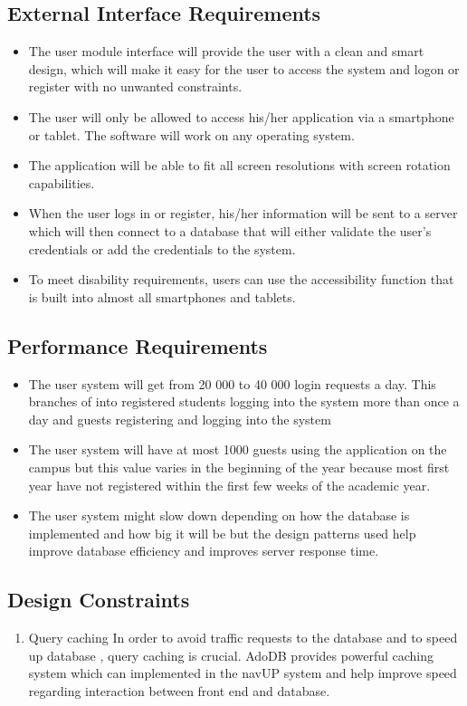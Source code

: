 \subsection{External Interface Requirements}
\begin{itemize}
	\item The user module interface will provide the user with a clean and smart design, which will make it easy for the user to access the system and logon or register with no unwanted constraints.
	\item The user will only be allowed to access his/her application via a smartphone or tablet. The software will work on any operating system. 
        \item The application will be able to fit all screen resolutions with screen rotation capabilities.
	\item When the user logs in or register, his/her information will be sent to a server which will then connect to a database that will either validate the user’s credentials or add the credentials to the system.
	\item To meet disability requirements, users can use the accessibility function that is built into almost all smartphones and tablets.
\end{itemize}
\subsection{Performance Requirements}
\begin{itemize}
	\item The user system will get from 20 000 to 40 000 login requests a day. This branches of into registered students logging into the system more than once a day and guests registering and logging into the system
	\item The user system will have at most 1000 guests using the application on the campus but this value varies in the beginning of the year because most first year have not registered within the first few weeks of the academic year. 
        \item The user system might slow down depending on how the database is implemented and how big it will be but the design patterns used help improve database efficiency and improves server response time.
\end{itemize}
\subsection{Design Constraints}
\begin{enumerate}
	\item Query caching
	\newline
	In order to avoid traffic requests to the database and to speed up database , query caching is crucial. AdoDB provides powerful caching system which can implemented in the navUP system and help improve speed regarding interaction between front end and database.
\end{enumerate}
